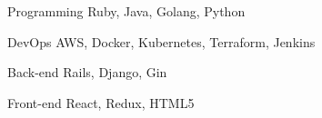 
\begin{cvskills}
  \cvskill
    {Programming} %
    {Ruby, Java, Golang, Python} %

  \cvskill
    {DevOps} %
    {AWS, Docker, Kubernetes, Terraform, Jenkins} %

  \cvskill
    {Back-end} %
    {Rails, Django, Gin} %

  \cvskill
    {Front-end} %
    {React, Redux, HTML5} %


\end{cvskills}